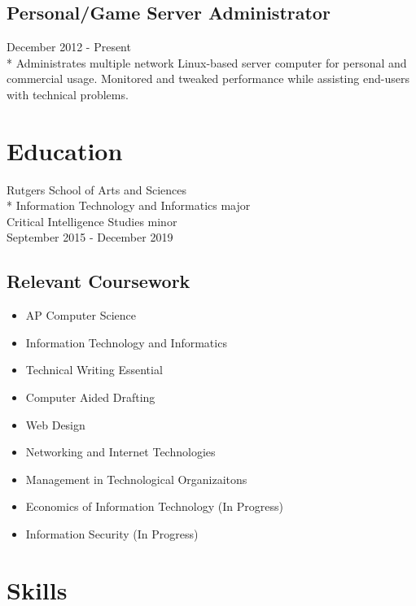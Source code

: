 \documentclass{article}
\begin{document}
\begin{multicols}{2}
\subsection{Personal/Game Server Administrator}
December 2012 - Present\\*
Administrates multiple network Linux-based server computer for personal and commercial usage. Monitored and tweaked performance while assisting end-users with technical problems.  

\section{Education}
Rutgers School of Arts and Sciences\\*
Information Technology and Informatics major\\
Critical Intelligence Studies minor\\
September 2015 - December 2019

\subsection{Relevant Coursework}
\begin{itemize}
\item AP Computer Science
\item Information Technology and Informatics
\item Technical Writing Essential
\item Computer Aided Drafting
\item Web Design
\item Networking and Internet Technologies
\item Management in Technological Organizaitons
\item Economics of Information Technology (In Progress)
\item Information Security (In Progress)
\end{itemize}


\section{Skills}

\iffalse
\subsection{Soft Skills}
Technical Writing/Documentation Writing, Router Configuration, Server Administration, Raspberry Pi, Arduino
\fi


\end{multicols}
\end{document}
